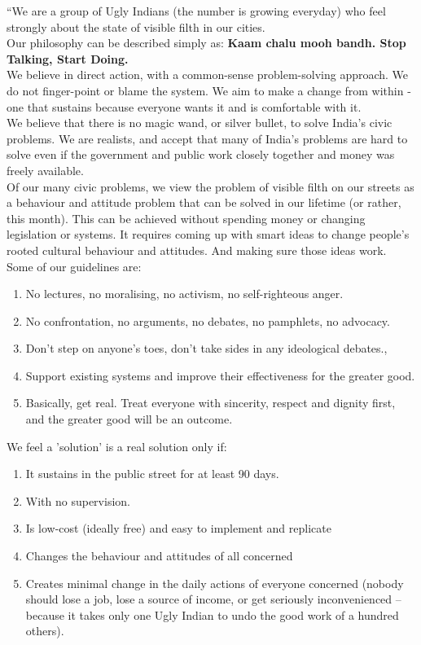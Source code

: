 \documentclass[10pt]{article}
\begin{document}
``We are a group of Ugly Indians (the number is growing everyday) who feel strongly about the state of visible filth in our cities.\\
Our philosophy can be described simply as: \textbf{Kaam chalu mooh bandh. Stop Talking, Start Doing.}\\
We believe in direct action, with a common-sense problem-solving approach. We do not finger-point or blame the system. We aim to make a change from within - one that sustains because everyone wants it and is comfortable with it.\\
We believe that there is no magic wand, or silver bullet, to solve India's civic problems. We are realists, and accept that many of India's problems are hard to solve even if the government and public work closely together and money was freely available.\\
Of our many civic problems, we view the problem of visible filth on our streets as a behaviour and attitude problem that can be solved in our lifetime (or rather, this month). This can be achieved without spending money or changing legislation or systems. It requires coming up with smart ideas to change people's rooted cultural behaviour and attitudes. And making sure those ideas work.\\
Some of our guidelines are:
\begin{enumerate}
	\item No lectures, no moralising, no activism, no self-righteous anger.
	\item No confrontation, no arguments, no debates, no pamphlets, no advocacy.
	\item Don’t step on anyone’s toes, don’t take sides in any ideological debates.,
	\item Support existing systems and improve their effectiveness for the greater good.
	\item Basically, get real. Treat everyone with sincerity, respect and dignity first, and the greater good will be an outcome.
\end{enumerate}
We feel a 'solution' is a real solution only if:
\begin{enumerate}
	\item It sustains in the public street for at least 90 days.
	\item With no supervision.
	\item Is low-cost (ideally free) and easy to implement and replicate
	\item Changes the behaviour and attitudes of all concerned
	\item Creates minimal change in the daily actions of everyone concerned
    (nobody should lose a job, lose a source of income, or get seriously
    inconvenienced – because it takes only one Ugly Indian to undo the
    good work of a hundred others).
\end{enumerate}
\end{document}
